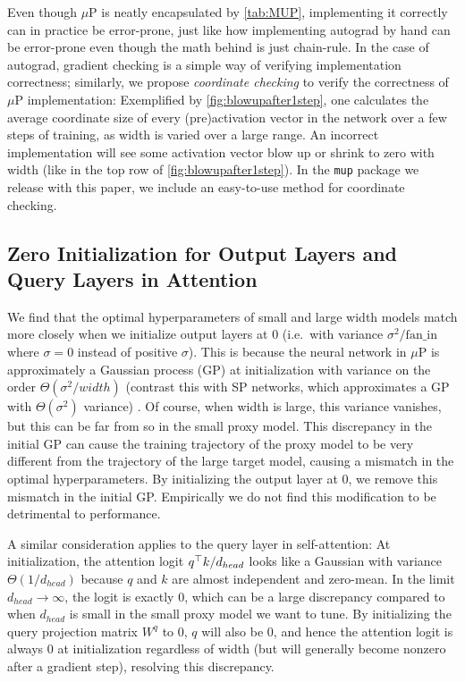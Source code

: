 \documentclass{article}
\theoremstyle{definition}
\newcommand{\fanin}{\mathrm{fan\_in}}
\begin{document}
Even though $\mu$P is neatly encapsulated by \cref{tab:MUP}, implementing it correctly can in practice be error-prone, just like how implementing autograd by hand can be error-prone even though the math behind is just chain-rule.
In the case of autograd, gradient checking is a simple way of verifying implementation correctness; similarly, we propose \emph{coordinate checking} to verify the correctness of $\mu$P implementation:
Exemplified by \cref{fig:blowupafter1step}, one calculates the average coordinate size of every (pre)activation vector in the network over a few steps of training, as width is varied over a large range.
An incorrect implementation will see some activation vector blow up or shrink to zero with width (like in the top row of \cref{fig:blowupafter1step}).
In the \texttt{mup} package we release with this paper, we include an easy-to-use method for coordinate checking.

\subsection{Zero Initialization for Output Layers and Query Layers in Attention}
\label{sec:outputzeroinit}

We find that the optimal hyperparameters of small and large width models match more closely when we initialize output layers at 0 (i.e.\ with variance $\sigma^2/\fanin{}$ where $\sigma = 0$ instead of positive $\sigma$).
This is because the neural network in $\mu$P is approximately a Gaussian process (GP) at initialization with variance on the order $\Theta(\sigma^2/width)$
(contrast this with SP networks, which approximates a GP with $\Theta(\sigma^2)$ variance)
\citep{TP1,TP4,lee_deep_2018,matthews_gaussian_2018}.
Of course, when width is large, this variance vanishes, but this can be far from so in the small proxy model.
This discrepancy in the initial GP can cause the training trajectory of the proxy model to be very different from the trajectory of the large target model, causing a mismatch in the optimal hyperparameters.
By initializing the output layer at 0, we remove this mismatch in the initial GP.
Empirically we do not find this modification to be detrimental to performance.

A similar consideration applies to the query layer in self-attention:
At initialization, the attention logit $q^\top k / {d_{head}}$ looks like a Gaussian with variance $\Theta(1/d_{head})$ because $q$ and $k$ are almost independent and zero-mean.
In the limit $d_{head} \to\infty$, the logit is exactly 0, which can be a large discrepancy compared to when $d_{head}$ is small in the small proxy model we want to tune.
By initializing the query projection matrix $W^q$ to 0, $q$ will also be 0, and hence the attention logit is always 0 at initialization regardless of width (but will generally become nonzero after a gradient step), resolving this discrepancy.
\end{document}
